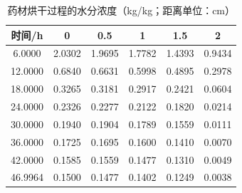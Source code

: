 \begin{table}[htbp]
  \centering
  \caption{药材烘干过程的水分浓度（kg/kg；距离单位：cm）}
  \label{tab:q3-moisture}
  \begin{tabular}{cccccc}
    \toprule
    时间/h & 0 & 0.5 & 1 & 1.5 & 2 \\
    \midrule
    6.0000 & 2.0302 & 1.9695 & 1.7782 & 1.4393 & 0.9434 \\
    12.0000 & 0.6840 & 0.6631 & 0.5998 & 0.4895 & 0.2978 \\
    18.0000 & 0.3265 & 0.3181 & 0.2917 & 0.2421 & 0.0604 \\
    24.0000 & 0.2326 & 0.2277 & 0.2122 & 0.1820 & 0.0214 \\
    30.0000 & 0.1940 & 0.1904 & 0.1789 & 0.1559 & 0.0111 \\
    36.0000 & 0.1725 & 0.1695 & 0.1600 & 0.1410 & 0.0070 \\
    42.0000 & 0.1585 & 0.1559 & 0.1477 & 0.1310 & 0.0049 \\
    46.9964 & 0.1500 & 0.1477 & 0.1402 & 0.1249 & 0.0038 \\
    \bottomrule
  \end{tabular}
\end{table}
